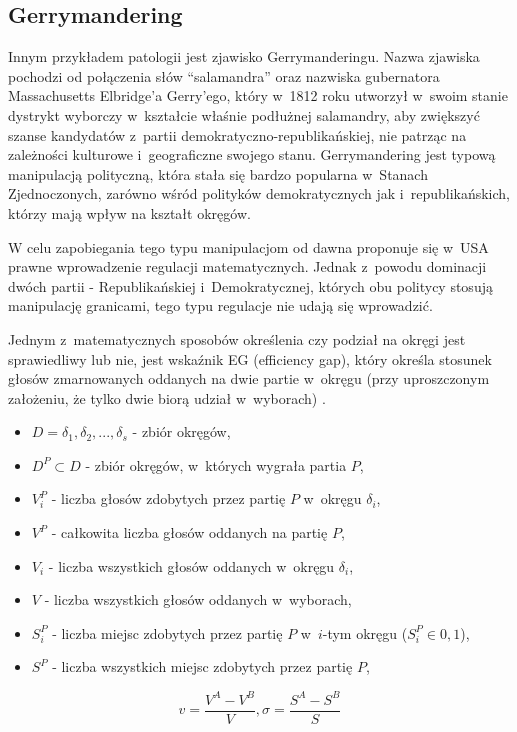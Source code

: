 \subsection{Gerrymandering}
Innym przykładem patologii jest zjawisko Gerrymanderingu. Nazwa zjawiska pochodzi od połączenia słów \enquote{salamandra} oraz nazwiska gubernatora Massachusetts Elbridge'a Gerry'ego, który w~1812 roku utworzył w~swoim stanie dystrykt wyborczy w~kształcie właśnie podłużnej salamandry, aby zwiększyć szanse kandydatów z~partii demokratyczno-republikańskiej, nie patrząc na zależności kulturowe i~geograficzne swojego stanu. Gerrymandering jest typową manipulacją polityczną, która stała się bardzo popularna w~Stanach Zjednoczonych, zarówno wśród polityków demokratycznych jak i~republikańskich, którzy mają wpływ na kształt okręgów.

W celu zapobiegania tego typu manipulacjom od dawna proponuje się w~USA prawne wprowadzenie regulacji matematycznych. Jednak z~powodu dominacji dwóch partii - Republikańskiej i~Demokratycznej, których obu politycy stosują manipulację granicami, tego typu regulacje nie udają się wprowadzić.

Jednym z~matematycznych sposobów określenia czy podział na okręgi jest sprawiedliwy lub nie, jest wskaźnik EG (efficiency gap), który określa stosunek głosów zmarnowanych oddanych na dwie partie w~okręgu (przy uproszczonym założeniu, że tylko dwie biorą udział w~wyborach) \cite{Łeń}.
\begin{itemize}
    \item $D = {\delta_1, \delta_2, ..., \delta_s}$ - zbiór okręgów,
    \item $D^P \subset D $ - zbiór okręgów, w~których wygrała partia $P$,
    \item $V_i^P$ - liczba głosów zdobytych przez partię $P$ w~okręgu $\delta_i$,
    \item $V^P$ - całkowita liczba głosów oddanych na partię $P$,
    \item $V_i$ - liczba wszystkich głosów oddanych w~okręgu $\delta_i$,
    \item $V$ - liczba wszystkich głosów oddanych w~wyborach,
    \item $S_i^P$ - liczba miejsc zdobytych przez partię $P$ w~$i$-tym okręgu ($S_i^P \in {0, 1}$),
    \item $S^P$ - liczba wszystkich miejsc zdobytych przez partię $P$,
\end{itemize}

\begin{equation}
    v = \frac{V^A - V^B}{V}, \sigma = \frac{S^A-S^B}{S}
\end{equation}

